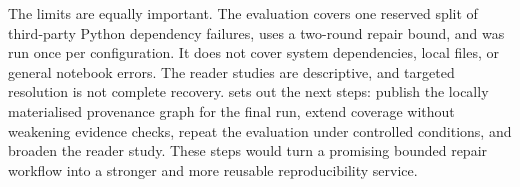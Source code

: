 The limits are equally important. The evaluation covers one reserved split of
third-party Python dependency failures, uses a two-round repair bound, and was
run once per configuration. It does not cover system dependencies, local files,
or general notebook errors. The reader studies are descriptive, and targeted
resolution is not complete recovery.  sets out the next
steps: publish the locally materialised provenance graph for the final run,
extend coverage without weakening evidence checks, repeat the evaluation under
controlled conditions, and broaden the reader study. These steps would turn a
promising bounded repair workflow into a stronger and more reusable
reproducibility service.
